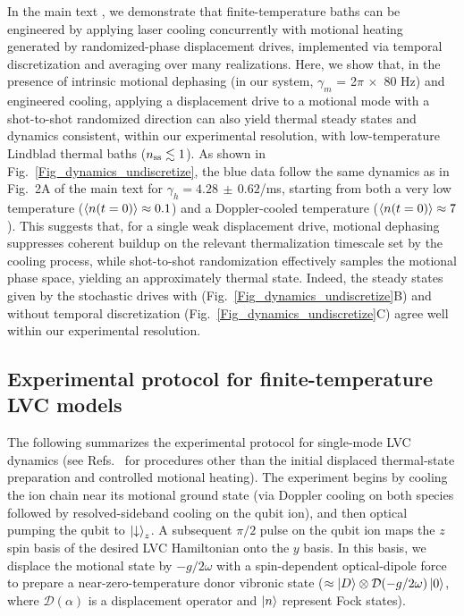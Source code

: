\documentclass[
reprint,
superscriptaddress,

amsmath,amssymb,
aps,
prl,

floatfix,
]{revtex4-2}
\begin{document}
In the main text \cite{so2025fT}, we demonstrate that finite-temperature baths can be engineered by applying laser cooling concurrently with motional heating generated by randomized-phase displacement drives, implemented via temporal discretization and averaging over many realizations. Here, we show that, in the presence of intrinsic motional dephasing (in our system, $\gamma_m $ = 2$\pi\,\times$ 80 Hz) and engineered cooling, applying a displacement drive to a motional mode with a shot-to-shot randomized direction can also yield thermal steady states and dynamics consistent, within our experimental resolution, with low-temperature Lindblad thermal baths ($n_{\rm ss}\lesssim1$). As shown in Fig.~\ref{Fig_dynamics_undiscretize}, the blue data follow the same dynamics as in Fig.~2A of the main text \cite{so2025fT} for $\gamma_h=4.28\,\pm\,0.62$/ms, starting from both a very low temperature ($\braket{n(t=0)}\approx 0.1$) and a Doppler-cooled temperature ($\braket{n(t=0)}\approx 7$). This suggests that, for a single weak displacement drive, motional dephasing suppresses coherent buildup on the relevant thermalization timescale set by the cooling process, while shot-to-shot randomization effectively samples the motional phase space, yielding an approximately thermal state. Indeed, the steady states given by the stochastic drives with (Fig.~\ref{Fig_dynamics_undiscretize}B) and without temporal discretization (Fig.~\ref{Fig_dynamics_undiscretize}C) agree well within our experimental resolution.

\subsection*{Experimental protocol for finite-temperature LVC models}

The following summarizes the experimental protocol for single-mode LVC dynamics (see Refs.~\cite{so2024electrontransfer,so2025multimode} for procedures other than the initial displaced thermal-state preparation and controlled motional heating). The experiment begins by cooling the ion chain near its motional ground state (via Doppler cooling on both species followed by resolved-sideband cooling on the qubit ion), and then optical pumping the qubit to $\ket{\downarrow}_z$. A subsequent $\pi/2$ pulse on the qubit ion maps the $z$ spin basis of the desired LVC Hamiltonian onto the $y$ basis. In this basis, we displace the motional state by $-g/2\omega$ with a spin-dependent optical-dipole force to prepare a near-zero-temperature donor vibronic state ($\approx \ket{D}\otimes\mathcal{D}(-g/2\omega)\ket{0}$, where $\mathcal{D}(\alpha)$ is a displacement operator and $\ket{n}$ represent Fock states).
\end{document}
